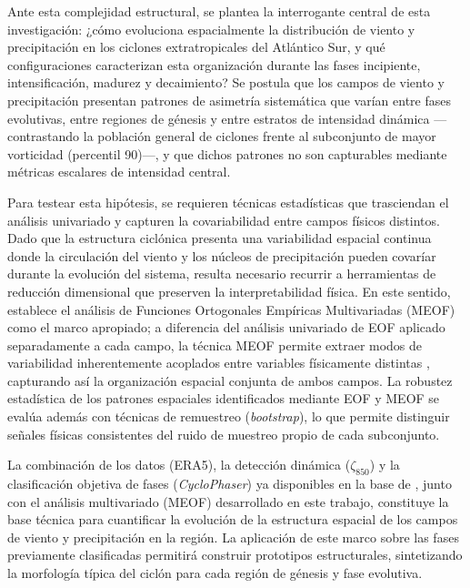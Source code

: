 Ante esta complejidad estructural, se plantea la interrogante central de esta investigación: ¿cómo evoluciona espacialmente la distribución de viento y precipitación en los ciclones extratropicales del Atlántico Sur, y qué configuraciones caracterizan esta organización durante las fases incipiente, intensificación, madurez y decaimiento? Se postula que los campos de viento y precipitación presentan patrones de asimetría sistemática que varían entre fases evolutivas, entre regiones de génesis y entre estratos de intensidad dinámica —contrastando la población general de ciclones frente al subconjunto de mayor vorticidad (percentil 90)—, y que dichos patrones no son capturables mediante métricas escalares de intensidad central.

\label{subsec:intro_estrategia_estadistica}
Para testear esta hipótesis, se requieren técnicas estadísticas que trasciendan el análisis univariado y capturen la covariabilidad entre campos físicos distintos. 
Dado que la estructura ciclónica presenta una variabilidad espacial continua donde la circulación del viento y los núcleos de precipitación pueden covaríar durante la evolución del sistema, resulta necesario recurrir a herramientas de reducción dimensional que preserven la interpretabilidad física. En este sentido, \citet{hannachi2007empirical} establece el análisis de Funciones Ortogonales Empíricas Multivariadas (MEOF) como el marco apropiado; a diferencia del análisis univariado de EOF aplicado separadamente a cada campo, la técnica MEOF permite extraer modos de variabilidad inherentemente acoplados entre variables físicamente distintas \citep{liang2018multivariate}, capturando así la organización espacial conjunta de ambos campos. La robustez estadística de los patrones espaciales identificados mediante EOF y MEOF se evalúa además con técnicas de remuestreo (\textit{bootstrap}), lo que permite distinguir señales físicas consistentes del ruido de muestreo propio de cada subconjunto.

La combinación de los datos (ERA5), la detección dinámica ($\zeta_{850}$) y la clasificación objetiva de fases (\textit{CycloPhaser}) ya disponibles en la base de \citet{coutodesouza2024new}, junto con el análisis multivariado (MEOF) desarrollado en este trabajo, constituye la base técnica para cuantificar la evolución de la estructura espacial de los campos de viento y precipitación en la región.
La aplicación de este marco sobre las fases previamente clasificadas permitirá construir prototipos estructurales, sintetizando la morfología típica del ciclón para cada región de génesis y fase evolutiva. 

